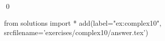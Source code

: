 
\begin{ex} 
  \label{ex:complex10}
  
  \qed
\end{ex} 
\begin{python0}
from solutions import *
add(label="ex:complex10",
    srcfilename='exercises/complex10/answer.tex') 
\end{python0}

